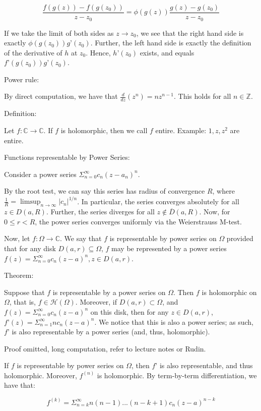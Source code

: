 \documentclass[10pt]{article}
\begin{document}
$$ \frac{f(g(z)) - f(g(z_0))}{z - z_0} = \phi(g(z)) \frac{g(z) - g(z_0)}{z - z_0} $$

If we take the limit of both sides as $z \to z_0$, we see that the right hand side is exactly $\phi(g(z_0)) g’(z_0)$. Further, the left hand side is exactly the definition of the derivative of $h$ at $z_0$. Hence, $h’(z_0)$ exists, and equals $f’(g(z_0)) g’(z_0)$.

Power rule:

By direct computation, we have that $\frac{d}{dz}(z^n) = n z^{n-1}$. This holds for all $n \in \mathbb{Z}$.

Definition:

Let $f: \mathbb{C} \to \mathbb{C}$. If $f$ is holomorphic, then we call $f$ entire. Example: $1, z, z^2$ are entire.

Functions representable by Power Series:

Consider a power series $\Sigma_{n=0}^\infty c_n (z-a_n)^n$.

By the root test, we can say this series has radius of convergence $R$, where $\frac{1}{R} = \limsup_{n \to \infty} | c_n|^{1/n}$. In particular, the series converges absolutely for all $z \in D(a,R)$. Further, the series diverges for all $z \not \in \overline{D}(a,R)$. Now, for $0 \leq r < R$, the power series converges uniformly via the Weierstrauss M-test.

Now, let $f: \Omega \to \mathbb{C}$. We say that $f$ is representable by power series on $\Omega$ provided that for any disk $D(a,r) \subseteq \Omega$, $f$ may be represented by a power series $f(z) = \Sigma_{n=0}^\infty c_n (z-a)^n, z \in D(a,r)$.

Theorem:

Suppose that $f$ is representable by a power series on $\Omega$. Then $f$ is holomorphic on $\Omega$, that is, $f \in \mathcal{H}(\Omega)$. Moreover, if $D(a,r) \subset \Omega$, and $f(z) = \Sigma_{n=0}^\infty c_n (z-a)^n$ on this disk, then for any $z \in D(a,r)$, $f’(z) = \Sigma_{n=1}^\infty nc_n(z-a)^n$. We notice that this is also a power series; as such, $f’$ is also representable by a power series (and, thus, holomorphic).

Proof omitted, long computation, refer to lecture notes or Rudin.

If $f$ is representable by power series on $\Omega$, then $f’$ is also representable, and thus holomorphic. Moreover, $f^{(n)}$ is holomorphic. By term-by-term differentiation, we have that:

$$ f^{(k)} = \Sigma_{n=k}^\infty n(n-1)...(n-k+1) c_n (z-a)^{n-k}$$
\end{document}
